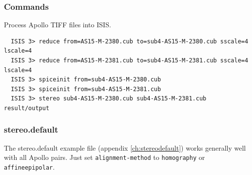 \pagebreak

\subsubsection*{Commands}

Process Apollo TIFF files into \ac{ISIS}.
\begin{verbatim}
  ISIS 3> reduce from=AS15-M-2380.cub to=sub4-AS15-M-2380.cub sscale=4 lscale=4
  ISIS 3> reduce from=AS15-M-2381.cub to=sub4-AS15-M-2381.cub sscale=4 lscale=4
  ISIS 3> spiceinit from=sub4-AS15-M-2380.cub
  ISIS 3> spiceinit from=sub4-AS15-M-2381.cub
  ISIS 3> stereo sub4-AS15-M-2380.cub sub4-AS15-M-2381.cub result/output
\end{verbatim}

\subsubsection*{stereo.default}

The stereo.default example file (appendix \ref{ch:stereodefault})
works generally well with all Apollo pairs. Just set
\texttt{alignment-method} to \texttt{homography} or
\texttt{affineepipolar}.







